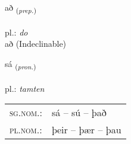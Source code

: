 \documentclass[frontgrid, backgrid]{flacards}\usepackage[]{graphicx}\usepackage[]{xcolor}
\begin{document}
\renewcommand{\blhead}{\vskip5pt {\small\bfseries\footnotesize Forsetning | przyimek }}
\renewcommand{\bcfoot}{\vskip5pt \hspace{2pt}{\small\bfseries\footnotesize 1K}}


{að \small{\textsubscript{(\textit{prep.})}} \\[1ex]
\textphonetic{[aːð]} \\
pl.: \emph{do} \\  [2ex]
að (Indeclinable)}

\renewcommand{\flhead}{\vskip5pt \fboxsep=0pt {\small\bfseries\footnotesize Fornafn | zaimek}}
\renewcommand{\fcfoot}{\vskip5pt \fboxsep=0pt \hspace{2pt}{\small\bfseries\footnotesize 1K}}

\renewcommand{\blhead}{\vskip5pt {\small\bfseries\footnotesize Fornafn | zaimek }}
\renewcommand{\bcfoot}{\vskip5pt \hspace{2pt}{\small\bfseries\footnotesize 1K}}


{sá \small{\textsubscript{(\textit{pron.})}} \\[1ex] %
\textphonetic{[sauː]} \\
pl.: \emph{tamten} \\  [2ex]
\renewcommand*{\arraystretch}{0.8}
\begin{tabular}{ll}
\textsc{sg.nom.}: & sá  --  sú -- það \\ 
\textsc{pl.nom.}: & þeir -- þær -- þau
\end{tabular}
}

\renewcommand{\flhead}{\vskip5pt \fboxsep=0pt {\small\bfseries\footnotesize Sagnorð | czasownik}}
\renewcommand{\fcfoot}{\vskip5pt \fboxsep=0pt \hspace{2pt}{\small\bfseries\footnotesize 1K}}

\renewcommand{\blhead}{\vskip5pt {\small\bfseries\footnotesize Sagnorð | czasownik }}
\renewcommand{\bcfoot}{\vskip5pt \hspace{2pt}{\small\bfseries\footnotesize 1K}}
\end{document}
